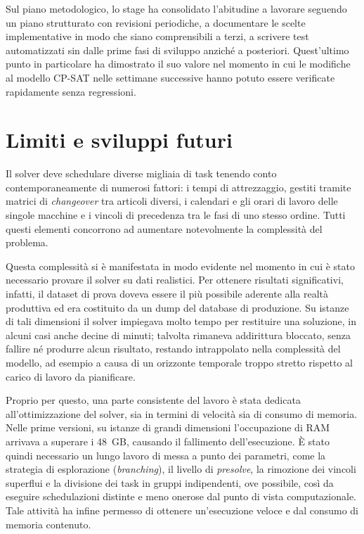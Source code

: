 Sul piano metodologico, lo stage ha consolidato l'abitudine a lavorare seguendo un piano strutturato con revisioni periodiche, a documentare le scelte implementative in modo che siano comprensibili a terzi, a scrivere test automatizzati sin dalle prime fasi di sviluppo anziché a posteriori. Quest'ultimo punto in particolare ha dimostrato il suo valore nel momento in cui le modifiche al modello CP-SAT nelle settimane successive hanno potuto essere verificate rapidamente senza regressioni.

\section{Limiti e sviluppi futuri}
\label{sec:sviluppi-futuri}

Il solver deve schedulare diverse migliaia di task tenendo conto contemporaneamente di numerosi fattori: i tempi di attrezzaggio, gestiti tramite matrici di \textit{changeover} tra articoli diversi, i calendari e gli orari di lavoro delle singole macchine e i vincoli di precedenza tra le fasi di uno stesso ordine. Tutti questi elementi concorrono ad aumentare notevolmente la complessità del problema.

Questa complessità si è manifestata in modo evidente nel momento in cui è stato necessario provare il solver su dati realistici. Per ottenere risultati significativi, infatti, il dataset di prova doveva essere il più possibile aderente alla realtà produttiva ed era costituito da un dump del database di produzione. Su istanze di tali dimensioni il solver impiegava molto tempo per restituire una soluzione, in alcuni casi anche decine di minuti; talvolta rimaneva addirittura bloccato, senza fallire né produrre alcun risultato, restando intrappolato nella complessità del modello, ad esempio a causa di un orizzonte temporale troppo stretto rispetto al carico di lavoro da pianificare.

Proprio per questo, una parte consistente del lavoro è stata dedicata all'ottimizzazione del solver, sia in termini di velocità sia di consumo di memoria. Nelle prime versioni, su istanze di grandi dimensioni l'occupazione di RAM arrivava a superare i 48~GB, causando il fallimento dell'esecuzione. È stato quindi necessario un lungo lavoro di messa a punto dei parametri, come la strategia di esplorazione (\textit{branching}), il livello di \textit{presolve}, la rimozione dei vincoli superflui e la divisione dei task in gruppi indipendenti, ove possibile, così da eseguire schedulazioni distinte e meno onerose dal punto di vista computazionale. Tale attività ha infine permesso di ottenere un'esecuzione veloce e dal consumo di memoria contenuto.

